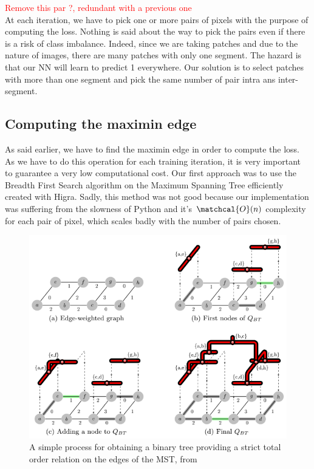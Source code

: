 \textcolor{red}{Remove this par ?, redundant with a previous one}\\
At each iteration, we have to pick one or more pairs of pixels with the purpose
of computing the loss. Nothing is said about the way to pick the pairs even if
there is a risk of class imbalance. Indeed, since we are taking patches and due
to the nature of images, there are many patches with only one segment. The
hazard is that our NN will learn to predict 1 everywhere. Our solution is to
select patches with more than one segment and pick the same number of pair
intra ans inter-segment.\\

\subsection{Computing the maximin edge}

As said earlier, we have to find the maximin edge in order to compute the loss.
As we have to do this operation for each training iteration, it is very important to
guarantee a very low computational cost. Our first approach was to use the
Breadth First Search algorithm on the Maximum Spanning Tree efficiently created
with Higra. Sadly, this method was not good because our implementation was
suffering from the slowness of Python and it's $\matchcal{O}(n)$ complexity for each pair of
pixel, which scales badly with the number of pairs chosen. \\

\begin{figure}[!htbp]
	\centering
	\includegraphics[width=0.7\linewidth]{./images/bpt.png}
	\caption{A simple process for obtaining a binary tree providing a strict
	total order relation on the edges of the MST, from~\cite{najman_playing_2013}}%
	\label{fig:bpt_method}
\end{figure}


